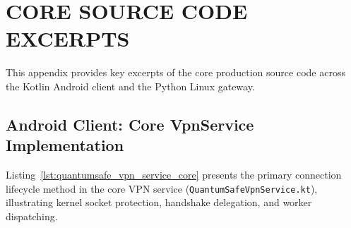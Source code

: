 
\chapter{CORE SOURCE CODE EXCERPTS}
\label{app:source_excerpts}

This appendix provides key excerpts of the core production source code across the Kotlin Android client and the Python Linux gateway.

\section{Android Client: Core VpnService Implementation}

Listing~\ref{lst:quantumsafe_vpn_service_core} presents the primary connection lifecycle method in the core VPN service (\texttt{QuantumSafe}\allowbreak\texttt{Vpn}\allowbreak\texttt{Service.kt}), illustrating kernel socket protection, handshake delegation, and worker dispatching.

